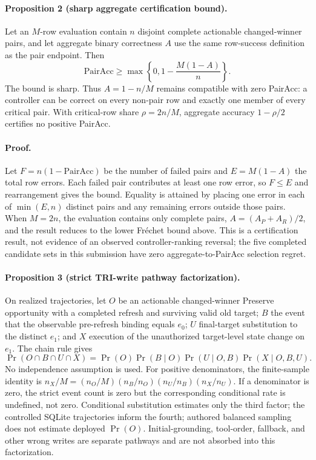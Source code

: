 \documentclass[10pt]{article}
\begin{document}
\paragraph{Proposition 2 (sharp aggregate certification bound).}
Let an $M$-row evaluation contain $n$ disjoint complete actionable changed-winner pairs, and let
aggregate binary correctness $A$ use the same row-success definition as the pair endpoint. Then
\[
\mathrm{PairAcc}\geq\max\left\{0,1-\frac{M(1-A)}{n}\right\}.
\]
The bound is sharp. Thus $A=1-n/M$ remains compatible with zero PairAcc: a controller can be
correct on every non-pair row and exactly one member of every critical pair. With critical-row
share $\rho=2n/M$, aggregate accuracy $1-\rho/2$ certifies no positive PairAcc.

\paragraph{Proof.}
Let $F=n(1-\mathrm{PairAcc})$ be the number of failed pairs and $E=M(1-A)$ the total row errors.
Each failed pair contributes at least one row error, so $F\leq E$ and rearrangement gives the
bound. Equality is attained by placing one error in each of $\min(E,n)$ distinct pairs and any
remaining errors outside those pairs. When $M=2n$, the evaluation contains only complete pairs,
$A=(A_P+A_R)/2$, and the result reduces to the lower Fr\'echet bound above. This is a certification
result, not evidence of an observed controller-ranking reversal; the five completed candidate
sets in this submission have zero aggregate-to-PairAcc selection regret.

\paragraph{Proposition 3 (strict TRI-write pathway factorization).}
On realized trajectories, let $O$ be an actionable changed-winner Preserve opportunity with a
completed refresh and surviving valid old target; $B$ the event that the observable pre-refresh
binding equals $e_0$; $U$ final-target substitution to the distinct $e_1$; and $X$ execution of
the unauthorized target-level state change on $e_1$. The chain rule gives
\[
\Pr(O\cap B\cap U\cap X)=
\Pr(O)\Pr(B\mid O)\Pr(U\mid O,B)\Pr(X\mid O,B,U).
\]
No independence assumption is used. For positive denominators, the finite-sample identity is
$n_X/M=(n_O/M)(n_B/n_O)(n_U/n_B)(n_X/n_U)$. If a denominator is zero, the strict event count is
zero but the corresponding conditional rate is undefined, not zero. Conditional substitution
estimates only the third factor; the controlled SQLite trajectories inform the fourth; authored
balanced sampling does not estimate deployed $\Pr(O)$. Initial-grounding, tool-order, fallback,
and other wrong writes are separate pathways and are not absorbed into this factorization.
\end{document}
